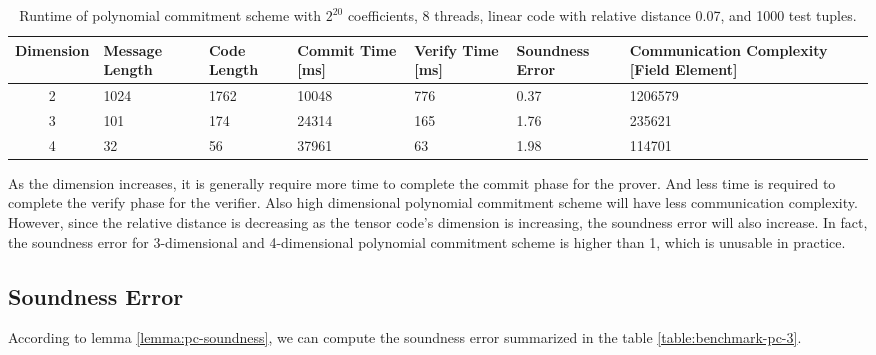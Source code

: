 \begin{table}[h!]
\centering
\begin{tabular}{| c | m{4em}  | m{3em}  | m{3.5em} | m{2.5em} | m{5em} | m{7em} |} 
 \hline
 Dimension & Message Length & Code Length & Commit Time [ms] & Verify Time [ms] & Soundness Error & Communication Complexity [Field Element] \\ [0.5ex] 
 \hline\hline
 2 & 1024   & 1762 & 10048 & 776 & 0.37 & 1206579  \\
 \hline
 3 & 101    & 174 & 24314 & 165 & 1.76 & 235621 \\
 \hline
 4 & 32     & 56 & 37961 & 63 & 1.98 & 114701  \\ 
 \hline
\end{tabular}
\caption{Runtime of polynomial commitment scheme with $2^{20}$ coefficients, 8 threads, linear code with relative distance 0.07, and 1000 test tuples.}
\label{table:benchmark-pc-2}
\end{table}


As the dimension increases, it is generally require more time to complete the commit phase for the prover. And less time is required to complete the verify phase for the verifier. Also high dimensional polynomial commitment scheme will have less communication complexity. However, since the relative distance is decreasing as the tensor code's dimension is increasing, the soundness error will also increase. In fact, the soundness error for 3-dimensional and 4-dimensional polynomial commitment scheme is higher than 1, which is unusable in practice.

\subsection{Soundness Error}

According to lemma \ref{lemma:pc-soundness}, we can compute the soundness error summarized in the table \ref{table:benchmark-pc-3}.

